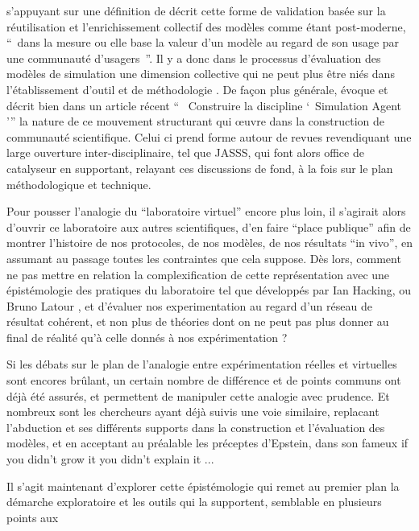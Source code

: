 \autocite{Rouchier2013} s'appuyant sur une définition de  décrit cette forme de validation basée sur la réutilisation et l'enrichissement collectif des modèles comme étant post-moderne, \enquote{ dans la mesure ou elle base la valeur d'un modèle au regard de son usage par une communauté d'usagers }. Il y a donc dans le processus d'évaluation des modèles de simulation une dimension collective qui ne peut plus être niés dans l'établissement d'outil et de méthodologie . De façon plus générale, \autocite{Rouchier2013} évoque et décrit bien dans un article récent \enquote{  Construire la discipline \enquote{ Simulation Agent }} la nature de ce mouvement structurant qui œuvre dans la construction de communauté scientifique. Celui ci prend forme autour de revues revendiquant une large ouverture inter-disciplinaire, tel que JASSS, qui font alors office de catalyseur en supportant, relayant ces discussions de fond, à la fois sur le plan méthodologique et technique.

Pour pousser l'analogie du \enquote{laboratoire virtuel} encore plus loin, il s'agirait alors d'ouvrir ce laboratoire aux autres scientifiques, d'en faire \enquote{place publique} afin de montrer l'histoire de nos protocoles, de nos modèles, de nos résultats \foreignquote{latin}{in vivo}, en assumant au passage toutes les contraintes que cela suppose. Dès lors, comment ne pas mettre en relation la complexification de cette représentation avec une épistémologie des pratiques du laboratoire tel que développés par Ian Hacking, ou Bruno Latour , et d'évaluer nos experimentation au regard d'un réseau de résultat cohérent, et non plus de théories dont on ne peut pas plus donner au final de réalité qu'à celle donnés à nos expérimentation ?

Si les débats sur le plan de l'analogie entre expérimentation réelles et virtuelles sont encores brûlant, un certain nombre de différence et de points communs ont déjà été assurés, et permettent de manipuler cette analogie avec prudence. Et nombreux sont les chercheurs ayant déjà suivis une voie similaire, replacant l'abduction et ses différents supports dans la construction et l'évaluation des modèles, et en acceptant au préalable les préceptes d'Epstein, dans son fameux if you didn't grow it you didn't explain it ... %

Il s'agit maintenant d'explorer cette épistémologie qui remet au premier plan la démarche exploratoire et les outils qui la supportent, semblable en plusieurs points aux

